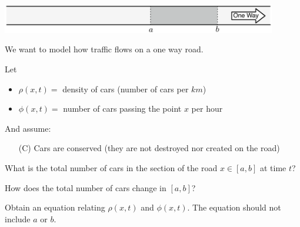 

\begin{slide}

\question

\begin{problem}
\begin{center}
\includegraphics[width=0.9\textwidth]{images/road-long.pdf}
\end{center}
We want to model how traffic flows on a one way road.
\end{problem}

Let
\begin{itemize}
\item $\rho(x,t) = $ density of cars (number of cars per $km$) %
\item $\phi(x,t) = $ number of cars passing the point $x$ per hour %
\end{itemize}

And assume:
\begin{itemize}
	\item[(C)] Cars are conserved (they are not destroyed nor created on the road)
\end{itemize}

\begin{parts}
\item What is the total number of cars in the section of the road $x \in [a,b]$ at time $t$?

\item How does the total number of cars change in $[a,b]$?


\item Obtain an equation relating $\rho(x,t)$ and $\phi(x,t)$. The equation should not include $a$ or $b$.	

\end{parts}


\end{slide}



